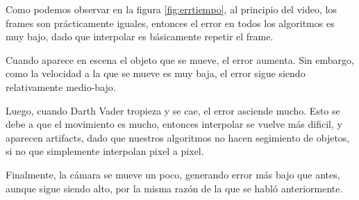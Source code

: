 Como podemos observar en la figura \ref{fig:errtiempo}, al principio del video, los frames son prácticamente iguales, entonces el error en todos los algoritmos es muy bajo, dado que interpolar es básicamente repetir el frame.

Cuando aparece en escena el objeto que se mueve, el error aumenta. Sin embargo, como la velocidad a la que se mueve es muy baja, el error sigue siendo relativamente medio-bajo. 

Luego, cuando Darth Vader tropieza y se cae, el error asciende mucho. Esto se debe a que el movimiento es mucho, entonces interpolar se vuelve más dificil, y aparecen artifacts, dado que nuestros algoritmos no hacen segimiento de objetos, si no que simplemente interpolan pixel a pixel.

Finalmente, la cámara se mueve un poco, generando error más bajo que antes, aunque sigue siendo alto, por la misma razón de la que se habló anteriormente.



